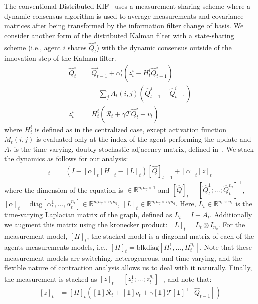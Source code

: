 \documentclass[journal]{IEEEtran}
\begin{document}
The conventional Distributed KIF~\cite{DBF} uses a measurement-sharing scheme where a dynamic consensus algorithm is used to average measurements and covariance matrices after being transformed by the information filter change of basis. We consider another form of the distributed Kalman filter with a state-sharing scheme (i.e., agent $i$ shares $\hat{Q}^i_t$) with the dynamic consensus outside of the innovation step of the Kalman filter.
\begin{align}
    \hat{Q}_t^i &= \hat{Q}_{t-1}^i + \alpha_t^i ( z_t^i - H_t^i \hat{Q}_{t-1}^i) \label{eq:agent_dist_dynamics} \nonumber \\
    & \ \ \ \ \  + \sum_j A_t(i,j) (\hat{Q}_{t-1}^j - \hat{Q}_{t-1}^i) \\
    z_t^i &= H^i_t (\mathcal{R}_t + \gamma \mathcal{T} \hat{Q}^{i}_t + v_t) 
    \label{eq:z_dist}
\end{align}
where $H^i_t$ is defined as in the centralized case, except activation function $M_t(i,j)$ is evaluated only at the index of the agent performing the update and $A_t$ is the time-varying, doubly stochastic adjacency matrix, defined in~\cite{DBF}. We stack the dynamics as follows for our analysis: 
\begin{align}
    [\hat{Q}]_t &= (I - [\alpha]_t [H]_t - [L]_t) [\hat{Q}]_{t-1} + [\alpha]_t [z]_t \label{eq:stacked_dist_ss}
\end{align}
where the dimension of the equation is $\in \mathbb{R}^{n_i n_q \times 1}$ and $[\hat{Q}]_t = [\hat{Q}_t^1; ...; \hat{Q}_t^{n_i}]^\intercal$, $[\alpha]_t = \mathrm{diag}[\alpha_t^1, ..., \alpha_t^{n_i}] \in \mathbb{R}^{n_i n_q \times n_i n_q}$, $[L]_t \in \mathbb{R}^{n_i n_q \times n_i n_q}$. Here, $L_t \in \mathbb{R}^{n_i \times n_i}$ is the time-varying Laplacian matrix of the graph, defined as $L_t = I-A_t$. Additionally we augment this matrix using the kronecker product: $[L]_t = L_t \otimes I_{n_q}$. For the measurement model, $[H]_t$, the stacked model is a diagonal matrix of each of the agents measurements models, i.e., $[H]_t = \mathrm{blkdiag}[H_t^1, ..., H_t^{n_i}]$. Note that these measurement models are switching, heterogeneous, and time-varying, and the flexible nature of contraction analysis allows us to deal with it naturally. Finally, the measurement is stacked as $[z]_t = [z_t^1; ...; z_t^{n_i}]^\intercal$, and note that:
\begin{align}
    \label{eq:z_stacked_update}
    [z]_t &= [H]_t ([\boldsymbol{1}]\mathcal{R}_t + [\boldsymbol{1}] v_t + \gamma [\boldsymbol{1}] \mathcal{T} [\boldsymbol{1}]^\intercal [\hat{Q}_{t-1}])
\end{align}
\end{document}
